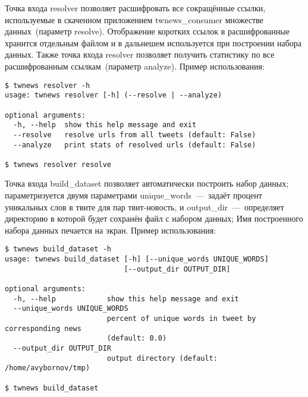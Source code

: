 
        Точка входа resolver позволяет расшифровать все сокращённые ссылки, используемые в скаченном приложением twnews\_consumer множестве данных~(параметр resolve).
        Отображение коротких ссылок в расшифрованные хранится отдельным файлом и в дальнешем используется при построении набора данных.
        Также точка входа resolver позволяет получить статистику по все расшифрованным ссылкам~(параметр analyze).
        Пример использования:
        \begin{lstlisting}
$ twnews resolver -h
usage: twnews resolver [-h] (--resolve | --analyze)

optional arguments:
  -h, --help  show this help message and exit
  --resolve   resolve urls from all tweets (default: False)
  --analyze   print stats of resolved urls (default: False)

$ twnews resolver resolve
        \end{lstlisting}


        Точка входа build\_dataset позволяет автоматически построить набор данных; параметризуется двумя параметрами
        unique\_words~---~задаёт процент уникальных слов в твите для пар твит-новость, и output\_dir~---~определяет директорию в которой будет сохранён файл с набором данных;
        Имя построенного набора данных печается на экран. Пример использования:
        \begin{lstlisting}
$ twnews build_dataset -h
usage: twnews build_dataset [-h] [--unique_words UNIQUE_WORDS]
                            [--output_dir OUTPUT_DIR]

optional arguments:
  -h, --help            show this help message and exit
  --unique_words UNIQUE_WORDS
                        percent of unique words in tweet by corresponding news
                        (default: 0.0)
  --output_dir OUTPUT_DIR
                        output directory (default: /home/avybornov/tmp)

$ twnews build_dataset
        \end{lstlisting}


